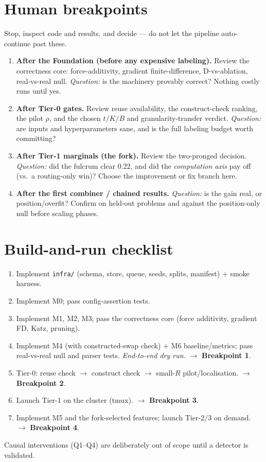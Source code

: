 \documentclass[11pt]{article}
\begin{document}
\section{Human breakpoints}
\label{sec:breakpoints}
Stop, inspect code and results, and decide --- do not let the pipeline auto-continue past these.
\begin{enumerate}
\item \textbf{After the Foundation (before any expensive labeling).} Review the correctness core:
force-additivity, gradient finite-difference, D-vs-ablation, real-vs-real null. \emph{Question:} is the
machinery provably correct? Nothing costly runs until yes.
\item \textbf{After Tier-0 gates.} Review reuse availability, the construct-check ranking, the pilot
$\rho$, and the chosen $t/K/B$ and granularity-transfer verdict. \emph{Question:} are inputs and
hyperparameters sane, and is the full labeling budget worth committing?
\item \textbf{After Tier-1 marginals (the fork).} Review the two-pronged decision. \emph{Question:} did
the fulcrum clear $0.22$, and did the \emph{computation axis} pay off (vs.\ a routing-only win)? Choose
the improvement or fix branch here.
\item \textbf{After the first combiner / chained results.} \emph{Question:} is the gain real, or
position/overfit? Confirm on held-out problems and against the position-only null before scaling phases.
\end{enumerate}

\section{Build-and-run checklist}
\begin{enumerate}
\item Implement \texttt{infra/} (schema, store, queue, seeds, splits, manifest) + smoke harness.
\item Implement M0; pass config-assertion tests.
\item Implement M1, M2, M3; pass the correctness core (force additivity, gradient FD, Katz, pruning).
\item Implement M4 (with constructed-swap check) + M6 baseline/metrics; pass real-vs-real null and parser
tests. \emph{End-to-end dry run.} $\rightarrow$ \textbf{Breakpoint 1}.
\item Tier-0: reuse check $\to$ construct check $\to$ small-$R$ pilot/localisation. $\rightarrow$
\textbf{Breakpoint 2}.
\item Launch Tier-1 on the cluster (tmux). $\rightarrow$ \textbf{Breakpoint 3}.
\item Implement M5 and the fork-selected features; launch Tier-2/3 on demand. $\rightarrow$
\textbf{Breakpoint 4}.
\end{enumerate}
Causal interventions (Q1--Q4) are deliberately out of scope until a detector is validated.
\end{document}
